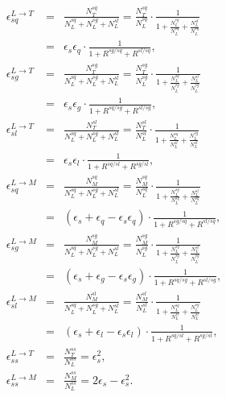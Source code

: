 \documentclass[12pt,oneandhalf,chaparabic,phys,ms,eng]{metu}
\begin{document}
\begin{eqnarray}
\epsilon_{sq}^{L \rightarrow T} & = & \frac{N_{T}^{sq}}{N_{L}^{sq}+N_{L}^{sg}+N_{L}^{sl}} = \frac{N_{T}^{sq}}{N_{L}^{sq}} \cdot \frac{1}{1 + \frac{N_{L}^{sg}}{N_{L}^{sq}} + \frac{N_{L}^{sl}}{N_{L}^{sq}}} \nonumber \\
& = & \epsilon_{s} \epsilon_{q} \cdot \frac{1}{1 + R^{sg/sq} + R^{sl/sq}}, \label{eq:eps17_}\\
\epsilon_{sg}^{L \rightarrow T} & = & \frac{N_{T}^{sg}}{N_{L}^{sq}+N_{L}^{sg}+N_{L}^{sl}} = \frac{N_{T}^{sg}}{N_{L}^{sg}} \cdot \frac{1}{1 + \frac{N_{L}^{sq}}{N_{L}^{sg}} + \frac{N_{L}^{sl}}{N_{L}^{sg}}} \nonumber \\
& = & \epsilon_{s} \epsilon_{g} \cdot \frac{1}{1 + R^{sq/sg} + R^{sl/sg}}, \label{eq:eps17__}\\
\epsilon_{sl}^{L \rightarrow T} & = & \frac{N_{T}^{sl}}{N_{L}^{sq}+N_{L}^{sg}+N_{L}^{sl}} = \frac{N_{T}^{sl}}{N_{L}^{sl}} \cdot \frac{1}{1 + \frac{N_{L}^{sq}}{N_{L}^{sl}} + \frac{N_{L}^{sg}}{N_{L}^{sl}}} \nonumber \\
& = & \epsilon_{s} \epsilon_{l} \cdot \frac{1}{1 + R^{sq/sl} + R^{sg/sl}}, \label{eq:eps17___}\\
\epsilon_{sq}^{L \rightarrow M} & = & \frac{N_{M}^{sq}}{N_{L}^{sq}+N_{L}^{sg}+N_{L}^{sl}} = \frac{N_{M}^{sq}}{N_{L}^{sq}} \cdot \frac{1}{1 + \frac{N_{L}^{sg}}{N_{L}^{sq}} + \frac{N_{L}^{sl}}{N_{L}^{sq}}} \nonumber \\
& = & \left( \epsilon_{s} + \epsilon_{q} - \epsilon_{s} \epsilon_{q} \right) \cdot \frac{1}{1 + R^{sg/sq} + R^{sl/sq}}, \label{eq:eps18_}\\
\epsilon_{sg}^{L \rightarrow M} & = & \frac{N_{M}^{sg}}{N_{L}^{sq}+N_{L}^{sg}+N_{L}^{sl}} = \frac{N_{M}^{sg}}{N_{L}^{sg}} \cdot \frac{1}{1 + \frac{N_{L}^{sq}}{N_{L}^{sg}} + \frac{N_{L}^{sl}}{N_{L}^{sg}}} \nonumber \\
& = & \left( \epsilon_{s} + \epsilon_{g} - \epsilon_{s} \epsilon_{g} \right) \cdot \frac{1}{1 + R^{sq/sg} + R^{sl/sg}}, \label{eq:eps18__}\\
\epsilon_{sl}^{L \rightarrow M} & = & \frac{N_{M}^{sl}}{N_{L}^{sq}+N_{L}^{sg}+N_{L}^{sl}} = \frac{N_{M}^{sl}}{N_{L}^{sl}} \cdot \frac{1}{1 + \frac{N_{L}^{sq}}{N_{L}^{sl}} + \frac{N_{L}^{sg}}{N_{L}^{sl}}} \nonumber \\
& = & \left( \epsilon_{s} + \epsilon_{l} - \epsilon_{s} \epsilon_{l} \right) \cdot \frac{1}{1 + R^{sq/sl} + R^{sg/sl}}, \label{eq:eps18___}\\
\epsilon_{ss}^{L \rightarrow T} & = & \frac{N_{T}^{ss}}{N_{L}^{ss}} = \epsilon_{s}^2, \label{eq:eps21_}\\
\epsilon_{ss}^{L \rightarrow M} & = & \frac{N_{M}^{ss}}{N_{L}^{ss}} = 2 \epsilon_{s} - \epsilon_{s}^2. \label{eq:eps22_}
\end{eqnarray}
\end{document}
